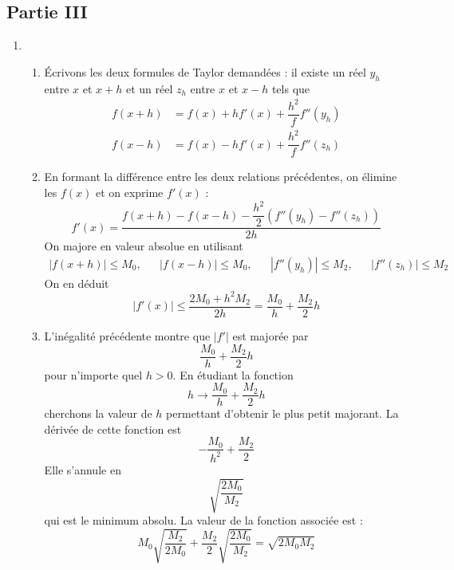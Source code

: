 \subsection*{Partie III}
\begin{enumerate}
 \item \begin{enumerate}
 \item \'Ecrivons les deux formules de Taylor demandées : il existe un réel $y_h$ entre $x$ et $x+h$ et un réel $z_h$ entre $x$ et $x-h$ tels que
\begin{align*}
 f(x+h) &= f(x) + h f'(x) +\dfrac{h^2}{f}f''(y_h) \\ 
f(x-h) &= f(x) - h f'(x) +\dfrac{h^2}{f}f''(z_h) 
\end{align*}
\item En formant la différence entre les deux relations précédentes, on élimine les $f(x)$ et on exprime $f'(x)$ :
\begin{displaymath}
 f'(x) = \dfrac{f(x+h)-f(x-h)-\dfrac{h^2}{2}(f''(y_h)-f''(z_h))}{2h}
\end{displaymath}
On majore en valeur absolue en utilisant
\begin{align*}
 |f(x+h)|\leq M_0, & & |f(x-h)|\leq M_0, & & |f''(y_h)|\leq M_2, & & |f''(z_h)|\leq M_2
\end{align*}
On en déduit 
\begin{displaymath}
 |f'(x)|\leq \dfrac{2M_0 + h^2M_2}{2h}=\dfrac{M_0}{h} +\dfrac{M_2}{2}h
\end{displaymath}

\item L'inégalité précédente montre que $|f'|$ est majorée par
\begin{displaymath}
 \dfrac{M_0}{h} +\dfrac{M_2}{2}h
\end{displaymath}
pour n'importe quel $h>0$. En étudiant la fonction
\begin{displaymath}
 h \rightarrow \dfrac{M_0}{h} +\dfrac{M_2}{2}h
\end{displaymath}
cherchons la valeur de $h$ permettant d'obtenir le plus petit majorant. La dérivée de cette fonction est
\begin{displaymath}
 -\dfrac{M_0}{h^2}+\dfrac{M_2}{2}
\end{displaymath}
Elle s'annule en 
\begin{displaymath}
 \sqrt{\dfrac{2M_0}{M_2}}
\end{displaymath}
qui est le minimum absolu. La valeur de la fonction associée est :
\begin{displaymath}
 M_0 \sqrt{\dfrac{M_2}{2M_0}}+\dfrac{M_2}{2}\sqrt{\dfrac{2M_0}{M_2}}=\sqrt{2M_0M_2}
\end{displaymath}
\end{enumerate}
 

\end{enumerate}
